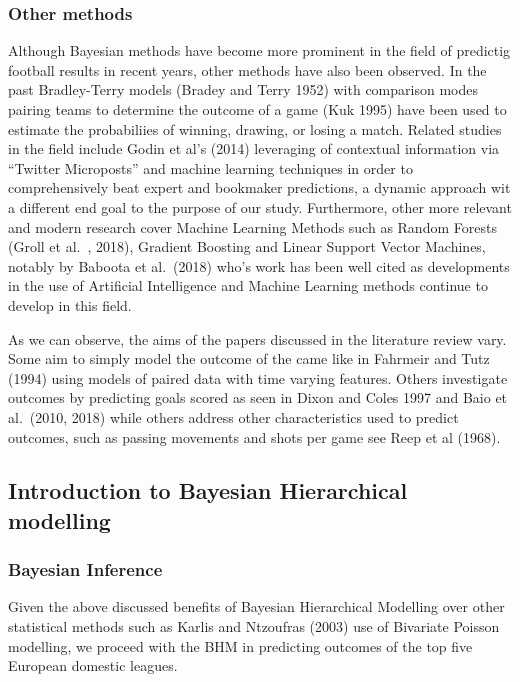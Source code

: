 \documentclass[
]{article}
\begin{document}
\hypertarget{other-methods}{%
\subsubsection{Other methods}\label{other-methods}}

Although Bayesian methods have become more prominent in the field of
predictig football results in recent years, other methods have also been
observed. In the past Bradley-Terry models (Bradey and Terry 1952) with
comparison modes pairing teams to determine the outcome of a game (Kuk
1995) have been used to estimate the probabiliies of winning, drawing,
or losing a match. Related studies in the field include Godin et al's
(2014) leveraging of contextual information via ``Twitter Microposts''
and machine learning techniques in order to comprehensively beat expert
and bookmaker predictions, a dynamic approach wit a different end goal
to the purpose of our study. Furthermore, other more relevant and modern
research cover Machine Learning Methods such as Random Forests (Groll et
al.~, 2018), Gradient Boosting and Linear Support Vector Machines,
notably by Baboota et al.~(2018) who's work has been well cited as
developments in the use of Artificial Intelligence and Machine Learning
methods continue to develop in this field.

As we can observe, the aims of the papers discussed in the literature
review vary. Some aim to simply model the outcome of the came like in
Fahrmeir and Tutz (1994) using models of paired data with time varying
features. Others investigate outcomes by predicting goals scored as seen
in Dixon and Coles 1997 and Baio et al.~(2010, 2018) while others
address other characteristics used to predict outcomes, such as passing
movements and shots per game see Reep et al (1968).

\hypertarget{introduction-to-bayesian-hierarchical-modelling}{%
\subsection{Introduction to Bayesian Hierarchical
modelling}\label{introduction-to-bayesian-hierarchical-modelling}}

\hypertarget{bayesian-inference}{%
\subsubsection{Bayesian Inference}\label{bayesian-inference}}

Given the above discussed benefits of Bayesian Hierarchical Modelling
over other statistical methods such as Karlis and Ntzoufras (2003) use
of Bivariate Poisson modelling, we proceed with the BHM in predicting
outcomes of the top five European domestic leagues.
\end{document}
